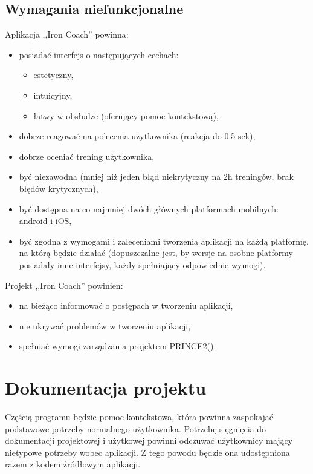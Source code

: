 \subsection{Wymagania niefunkcjonalne}
\noindent Aplikacja ,,Iron Coach'' powinna:
\begin{itemize}
  \item posiadać interfejs o następujących cechach:
    \begin{itemize}
      \item estetyczny,
      \item intuicyjny, 
      \item łatwy w obsłudze (oferujący pomoc kontekstową), 
    \end{itemize}
  \item dobrze reagować na polecenia użytkownika (reakcja do 0.5 sek),
  \item dobrze oceniać trening użytkownika,
  \item być niezawodna (mniej niż jeden błąd niekrytyczny na 2h treningów, brak błędów krytycznych),
  \item być dostępna na co najmniej dwóch głównych platformach mobilnych: android i iOS,
  \item być zgodna z wymogami i zaleceniami tworzenia aplikacji  na każdą platformę, na którą będzie działać (dopuszczalne jest, by wersje na osobne platformy posiadały inne interfejsy, każdy spełniający odpowiednie wymogi).
\end{itemize}
\vspace{2pt}
Projekt ,,Iron Coach'' powinien:
\begin{itemize}
  \item na bieżąco informować o postępach w tworzeniu aplikacji,
  \item nie ukrywać problemów w tworzeniu aplikacji,
  \item spełniać wymogi zarządzania projektem PRINCE2(\cite{Pr}).
\end{itemize}
\section{Dokumentacja projektu}
\noindent Częścią programu będzie pomoc kontekstowa, która powinna zaspokajać podstawowe potrzeby normalnego użytkownika. Potrzebę sięgnięcia do dokumentacji projektowej i użytkowej powinni odczuwać użytkownicy mający nietypowe potrzeby wobec aplikacji. Z tego powodu będzie ona udostępniona razem z kodem źródłowym aplikacji.
